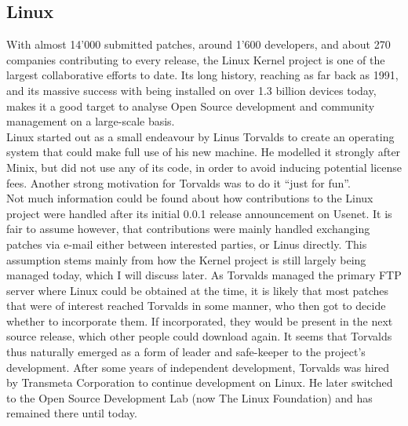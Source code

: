 \subsection{Linux}
With almost 14'000 submitted patches, around 1'600 developers, and about 270 companies contributing to every release\cite{linux-whowrites}, the Linux Kernel project is one of the largest collaborative efforts to date. Its long history, reaching as far back as 1991\cite{linux-announce}, and its massive success with being installed on over 1.3 billion devices\cite{linux-usage} today, makes it a good target to analyse Open Source development and community management on a large-scale basis. \\

Linux started out as a small endeavour by Linus Torvalds to create an operating system that could make full use of his new machine. He modelled it strongly after Minix, but did not use any of its code, in order to avoid inducing potential license fees. Another strong motivation for Torvalds was to do it ``just for fun''\cite{linus-biography,linux-history}. \\

Not much information could be found about how contributions to the Linux project were handled after its initial 0.0.1 release announcement on Usenet. It is fair to assume however, that contributions were mainly handled exchanging patches via e-mail either between interested parties, or Linus directly. This assumption stems mainly from how the Kernel project is still largely being managed today, which I will discuss later. As Torvalds managed the primary FTP server where Linux could be obtained at the time, it is likely that most patches that were of interest reached Torvalds in some manner, who then got to decide whether to incorporate them. If incorporated, they would be present in the next source release, which other people could download again. It seems that Torvalds thus naturally emerged as a form of leader and safe-keeper to the project's development. After some years of independent development, Torvalds was hired by Transmeta Corporation\cite{transmeta} to continue development on Linux. He later switched to the Open Source Development Lab (now The Linux Foundation) and has remained there until today\cite{linus-biography,linus-osdl}. \\

